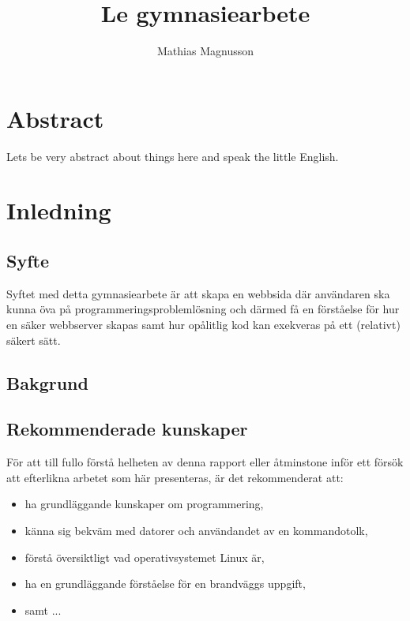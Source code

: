 \documentclass{article}
\author{Mathias Magnusson}
\title{Le gymnasiearbete}
\date{}
\begin{document}
\maketitle{}

\section*{Abstract}

Lets be very abstract about things here and speak the little English.

\clearpage

\tableofcontents

\clearpage

\section{Inledning}

\subsection{Syfte}

Syftet med detta gymnasiearbete är att skapa en webbsida där användaren ska
kunna öva på programmeringsproblemlösning och därmed få en förståelse för hur
en säker webbserver skapas samt hur opålitlig kod kan exekveras på ett
(relativt) säkert sätt.

\subsection{Bakgrund}

\subsection{Rekommenderade kunskaper}

För att till fullo förstå helheten av denna rapport eller åtminstone inför ett
försök att efterlikna arbetet som här presenteras, är det rekommenderat att:

\begin{itemize}
	\item ha grundläggande kunskaper om programmering,
	\item känna sig bekväm med datorer och användandet av en kommandotolk,
	\item förstå översiktligt vad operativsystemet Linux är,
	\item ha en grundläggande förståelse för en brandväggs uppgift,
	\item samt ...
\end{itemize}
\end{document}
